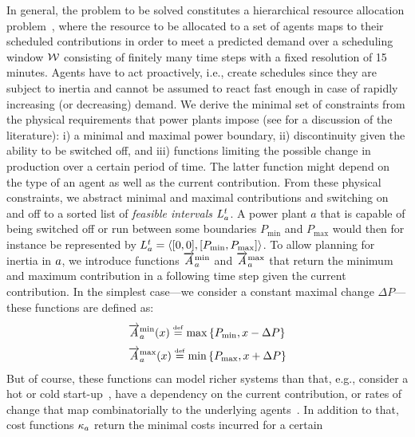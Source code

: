 \documentclass[conference]{IEEEtran}
\begin{document}
In general, the problem to be solved constitutes a hierarchical resource allocation problem~\cite{VanZandt1995},
where the resource to be allocated to a set of agents maps to their scheduled contributions in order
to meet a predicted demand over a scheduling window $\mathcal{W}$ consisting of finitely many time steps with a fixed resolution
of 15 minutes.
 Agents have to act proactively, i.e., create schedules since they
are subject to inertia and cannot be assumed to react fast enough in case of rapidly increasing (or decreasing) demand.
We derive the minimal set of constraints from the physical requirements that 
power plants impose (see \cite{SchiendorferSyn2014} for a discussion of the literature):
i) a minimal and maximal power boundary, ii) discontinuity given the ability to be switched off, and 
iii) functions limiting the possible change in production over a certain period of time.
The latter function
might depend on the type of an agent as well as the current contribution. 
From these physical constraints, we abstract minimal and maximal contributions
and switching on and off to a sorted list of \emph{feasible intervals} $L^{t}_{a}$.
A power plant $a$ that is capable of being switched off or run between some boundaries
$P_{\mathrm{min}}$ and $P_{\mathrm{max}}$ would then for instance be represented by 
$L^{t}_{a} = \langle [0,0], [P_{\mathrm{min}}, P_{\mathrm{max}}] \rangle$.
To allow planning for inertia in $a$, we introduce functions $\overrightarrow{A}^{\mathrm{min}}_{a}$ and
$\overrightarrow{A}^{\mathrm{max}}_{a}$ that return the minimum and maximum contribution in a following time step
given the current contribution. In the simplest case---we consider a constant maximal change $\Delta P$---these 
functions are defined as:
%
		\begin{align*}
		\label{eq:changeInContribution}
		&\ChangeSpeedMin\AnAgent(x) \overset{\underset{\mathrm{def}}{}}{=} \operatorname{max}\left\{P_{\mathrm{min}}, x - \Delta P\right\}\\
		&\ChangeSpeedMax\AnAgent(x) \overset{\underset{\mathrm{def}}{}}{=} \operatorname{min}\left\{P_{\mathrm{max}}, x + \Delta P\right\}
		\end{align*}
%
But of course, these functions can model richer systems than that, e.g., consider a hot or cold start-up~\cite{SchiendorferSyn2014},
have a dependency on the current contribution, or rates of change that map combinatorially to the underlying agents~\cite{Schiendorfer2014}. In addition to that,
cost functions $\kappa_{a}$ return the minimal costs incurred for a certain
\end{document}
